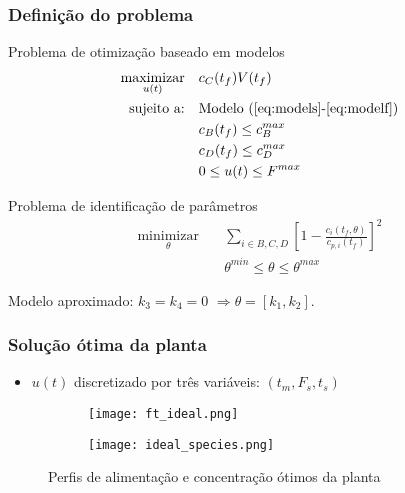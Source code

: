 \documentclass{beamer}
\begin{document}
\begin{frame}
	\frametitle{Definição do problema}	
	\begin{small}
		\begin{block}{Problema de otimização baseado em modelos}
			\begin{equation}
				\begin{alignedat}{2}
					\underset{u(t)}{\text{maximizar}} & \quad c_C(t_f)V(t_f)  \\
					\text{sujeito a:} & \text{\quad Modelo (\ref{eq:models}-\ref{eq:modelf})} \\
					& \quad c_B(t_f) \leq c_B^{max} \\
					& \quad c_D(t_f) \leq c_D^{max} \\
					& \quad 0 \leq u(t) \leq F^{max}
				\end{alignedat}
				\label{eq:rto_static_study}
			\end{equation}
		\end{block}
	\end{small}

	\begin{small}
		\begin{block}{Problema de identificação de parâmetros}
			\begin{equation}
				\begin{alignedat}{2}
					\underset{\theta}{\text{minimizar}} & \quad \sum_{i \in {B,C,D}}^{}  \left[ 1 - \frac{c_i(t_f,\theta)}{c_{p,i}(t_f) }  \right] ^2 \\
					& \quad \theta^{min} \leq \theta \leq \theta^{max}
				\end{alignedat}
				\label{eq:rto_static_ident}
			\end{equation}
		\end{block}
	\end{small}
	Modelo aproximado: $k_3 = k_4 = 0$  $\Rightarrow  \theta = [k_1, k_2]$.

\end{frame}	

\begin{frame}
	\frametitle{Solução ótima da planta}
	\begin{itemize}
		\item  $u(t)$ discretizado por três variáveis: $(t_m, F_s, t_s)$
	\end{itemize}
	\begin{figure}
		\centering
		\begin{subfigure}[b]{0.5\textwidth}
			\centering
			\texttt{[image: ft\_ideal.png]}
			\label{fig:ideal_ft}
		\end{subfigure}\hfill
		\begin{subfigure}[b]{0.5\textwidth}
			\centering
			\texttt{[image: ideal\_species.png]}
			\label{fig:ideal_species}
		\end{subfigure}
		\caption{Perfis de alimentação e concentração ótimos da planta}
		\label{fig:ideal_curves}
	\end{figure}
\end{frame}
\end{document}
